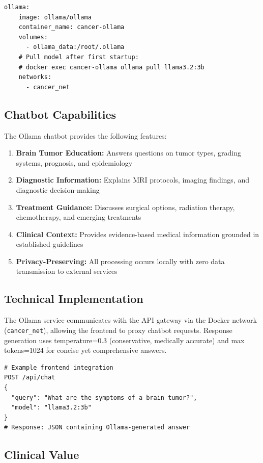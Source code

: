 \documentclass[12pt,a4paper]{article}
\begin{document}
\begin{lstlisting}
ollama:
    image: ollama/ollama
    container_name: cancer-ollama
    volumes:
      - ollama_data:/root/.ollama
    # Pull model after first startup:
    # docker exec cancer-ollama ollama pull llama3.2:3b
    networks:
      - cancer_net
\end{lstlisting}

\subsection{Chatbot Capabilities}

The Ollama chatbot provides the following features:

\begin{enumerate}
    \item \textbf{Brain Tumor Education:} Answers questions on tumor types, grading systems, prognosis, and epidemiology
    \item \textbf{Diagnostic Information:} Explains MRI protocols, imaging findings, and diagnostic decision-making
    \item \textbf{Treatment Guidance:} Discusses surgical options, radiation therapy, chemotherapy, and emerging treatments
    \item \textbf{Clinical Context:} Provides evidence-based medical information grounded in established guidelines
    \item \textbf{Privacy-Preserving:} All processing occurs locally with zero data transmission to external services
\end{enumerate}

\subsection{Technical Implementation}

The Ollama service communicates with the API gateway via the Docker network (\texttt{cancer\_net}), allowing the frontend to proxy chatbot requests. Response generation uses temperature=0.3 (conservative, medically accurate) and max tokens=1024 for concise yet comprehensive answers.

\begin{lstlisting}
# Example frontend integration
POST /api/chat
{
  "query": "What are the symptoms of a brain tumor?",
  "model": "llama3.2:3b"
}
# Response: JSON containing Ollama-generated answer
\end{lstlisting}

\subsection{Clinical Value}
\end{document}

